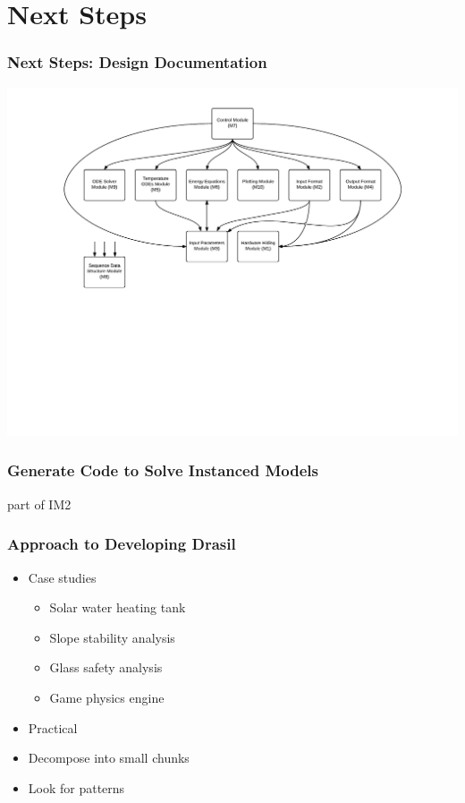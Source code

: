 \documentclass{beamer}
\begin{document}

\section[Next Steps]{Next Steps}


\begin{frame}

\frametitle{Next Steps: Design Documentation}

\begin{center}
\includegraphics[scale=0.47]{UsesHierarchy.pdf}
\end{center}

\end{frame}


\begin{frame}

\frametitle{Generate Code to Solve Instanced Models}

part of IM2

\end{frame}


\begin{frame}

\frametitle{Approach to Developing Drasil}

\begin{itemize}
\item Case studies
\begin{itemize}
\item Solar water heating tank
\item Slope stability analysis
\item Glass safety analysis
\item Game physics engine
\end{itemize}
\item Practical
\item Decompose into small chunks
\item Look for patterns
\end{itemize}

\end{frame}
\end{document}
